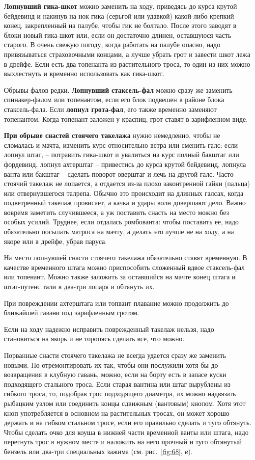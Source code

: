 \documentclass[a4paper, 12pt, twoside, final]{scrbook}
\begin{document}
\textbf{Лопнувший гика-шкот} можно заменить на ходу, приведясь до курса крутой бейдевинд и накинув на нок гика (серьгой или удавкой) какой-либо крепкий конец, закрепленный на палубе, чтобы гик не болтало. После этого заводят в блоки новый гика-шкот или, если он достаточно длинен, оставшуюся часть старого. В очень свежую погоду, когда работать на палубе опасно, надо привязываться страховочными концами, а лучше убрать грот и завести шкот лежа в дрейфе. Если есть два топенанта из растительного троса, то один из них можно выхлестнуть и временно использовать как гика-шкот.

Обрывы фалов редки. \textbf{Лопнувший стаксель-фал} можно сразу же заменить спинакер-фалом или топенантом, если его блок подвешен в районе блока стаксель-фала. Если \textbf{лопнул грота-фал}, его также временно заменяют топенантом. Когда топенант заложен у краспиц, грот ставят в зарифленном виде.

\textbf{При обрыве снастей стоячего такелажа} нужно немедленно, чтобы не сломалась и мачта, изменить курс относительно ветра или сменить галс: если лопнул штаг, \--- потравить гика-шкот и увалиться на курс полный бакштаг или фордевинд, лопнул ахтерштаг \--- привестись до курса крутой бейдевинд, лопнула ванта или бакштаг \--- сделать поворот оверштаг и лечь на другой галс. Часто стоячий такелаж не лопается, а отдается из-за плохо законтренной гайки (пальца) или отвернувшегося талрепа. Обычно это происходит на длинных галсах, когда подветренный такелаж провисает, а качка и удары волн довершают дело. Важно вовремя заметить случившееся, а уж поставить снасть на место можно без особых усилий. Труднее, если отдалась ромбованта: чтобы поставить ее, надо обязательно посылать матроса на мачту, а делать это лучше не на ходу, а на якоре или в дрейфе, убрав паруса.

На место лопнувшей снасти стоячего такелажа обязательно ставят временную. В качестве временного штага можно приспособить сложенный вдвое стаксель-фал или топенант. Можно также заложить за оставшийся на мачте конец штага и штаг-путенс тали в два-три лопаря и обтянуть их.

При повреждении ахтерштага или топвант плавание можно продолжить до ближайшей гавани под зарифленным гротом.

Если на ходу надежно исправить поврежденный такелаж нельзя, надо становиться на якорь и не торопясь сделать все, что можно.

Порванные снасти стоячего такелажа не всегда удается сразу же заменить новыми. Но отремонтировать их так, чтобы они послужили хотя бы до возвращения в клубную гавань, можно, если на борту есть в запасе куски подходящего стального троса. Если старая вантина или штаг вырублены из гибкого троса, то, подобрав трос подходящего диаметра, их можно надвязать рыбацким узлом или соединить концы сдвижным (вантовым) кнопом. Хотя этот кноп употребляется в основном на растительных тросах, он может хорошо держать и на гибком стальном тросе, если его правильно сделать и туго обтянуть. Чтобы сделать очко для коуша в нижней части временной ванты или штага, надо перегнуть трос в нужном месте и наложить на него прочный и туго обтянутый бензель или два-три специальных зажима (см. рис.~\ref{fig:68}, \textit{в}).
\end{document}
